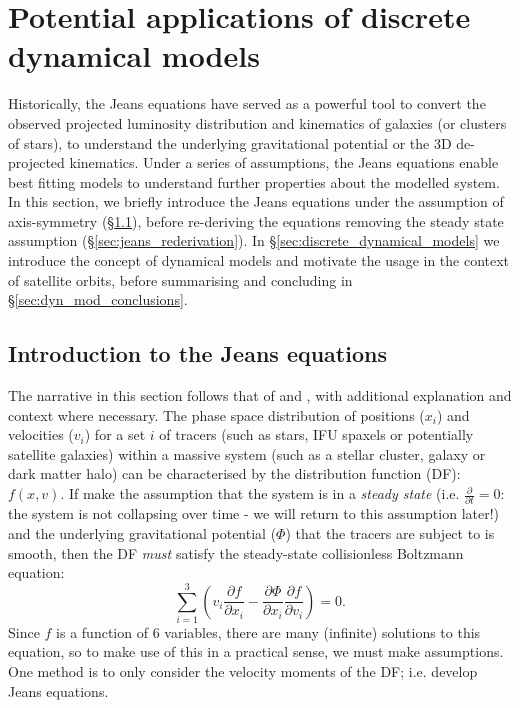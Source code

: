 \section{Potential applications of discrete dynamical models} \label{sec:jam}
Historically, the Jeans equations have served as a powerful tool to convert the observed projected luminosity distribution and kinematics of galaxies (or clusters of stars), to understand the underlying gravitational potential or the 3D de-projected kinematics. Under a series of assumptions, the Jeans equations enable best fitting models to understand further properties about the modelled system. In this section, we briefly introduce the Jeans equations under the assumption of axis-symmetry (\S\ref{sec:jeans_intro}), before re-deriving the equations removing the steady state assumption (\S\ref{sec:jeans_rederivation}). In \S\ref{sec:discrete_dynamical_models} we introduce the concept of dynamical models and motivate the usage in the context of satellite orbits, before summarising and concluding in \S\ref{sec:dyn_mod_conclusions}. 

\subsection{Introduction to the Jeans equations} \label{sec:jeans_intro}
The narrative in this section follows that of \citet{cappellari2008} and \citet[BT henceforth;][]{binneytremaine}, with additional explanation and context where necessary. The phase space distribution of positions ($x_{i}$) and velocities ($v_{i}$) for a set $i$ of tracers (such as stars, IFU spaxels or potentially satellite galaxies) within a massive system (such as a stellar cluster, galaxy or dark matter halo) can be characterised by the distribution function (DF): $f(x,v)$. If make the assumption that the system is in a \textit{steady state} (i.e. $\frac{\partial}{\partial t} = 0$: the system is not collapsing over time - we will return to this assumption later!) and the underlying gravitational potential ($\Phi$) that the tracers are subject to is smooth, then the DF \textit{must} satisfy the steady-state collisionless Boltzmann equation:
\begin{equation}
\sum^{3}_{i=1}\left(v_{i}\frac{\partial f}{\partial x_i} - \frac{\partial \Phi}{\partial x_{i}}\frac{\partial f}{\partial v_{i}} \right) = 0.
\end{equation}
Since $f$ is a function of 6 variables, there are many (infinite) solutions to this equation, so to make use of this in a practical sense, we must make assumptions. One method is to only consider the velocity moments of the DF; i.e. develop Jeans equations. 

